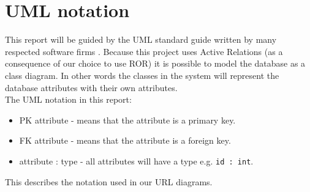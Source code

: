 \section{UML notation} \label{section:uml_notation}

This report will be guided by the UML standard guide written by many respected software firms \citep{UML_notation}.
Because this project uses Active Relations (as a consequence of our choice to use ROR) it is possible to model the database as a class diagram. 
In other words the classes in the system will represent the database attributes with their own attributes. \\

The UML notation in this report:
\begin{itemize}
	\item PK attribute - means that the attribute is a primary key.
	\item FK attribute - means that the attribute is a foreign key.
	\item attribute : type - all attributes will have a type e.g. \verb+id : int+.
\end{itemize}

This describes the notation used in our URL diagrams.